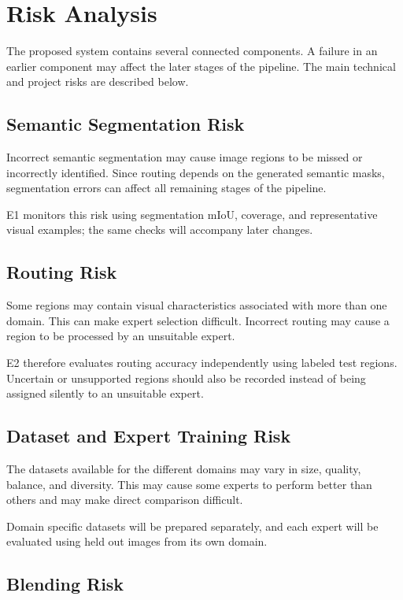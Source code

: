 \documentclass{FastFyp}
\begin{document}
\section{Risk Analysis}

The proposed system contains several connected components. A failure in an earlier component may affect the later stages of the pipeline. The main technical and project risks are described below.

\subsection{Semantic Segmentation Risk}

Incorrect semantic segmentation may cause image regions to be missed or incorrectly identified. Since routing depends on the generated semantic masks, segmentation errors can affect all remaining stages of the pipeline.

E1 monitors this risk using segmentation mIoU, coverage, and representative visual examples; the same checks will accompany later changes.

\subsection{Routing Risk}

Some regions may contain visual characteristics associated with more than one domain. This can make expert selection difficult. Incorrect routing may cause a region to be processed by an unsuitable expert.

E2 therefore evaluates routing accuracy independently using labeled test regions. Uncertain or unsupported regions should also be recorded instead of being assigned silently to an unsuitable expert.

\subsection{Dataset and Expert Training Risk}

The datasets available for the different domains may vary in size, quality, balance, and diversity. This may cause some experts to perform better than others and may make direct comparison difficult.

Domain specific datasets will be prepared separately, and each expert will be evaluated using held out images from its own domain.

\subsection{Blending Risk}
\end{document}

